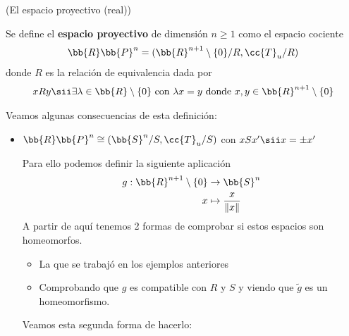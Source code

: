  \begin{ejemplo}
    (El espacio proyectivo (real))

    Se define el \textbf{espacio proyectivo} de dimensión $n\geq 1$ como el espacio cociente
    \begin{align*}
        \bb{R}\bb{P}^n = (\bb{R}^{n+1}\setminus \{0\}/R, \cc{T}_u/R)
    \end{align*}
    donde $R$ es la relación de equivalencia dada por 
    \begin{align*}
        xRy \sii \exists \lambda \in \bb{R}\setminus \{0\} \text{ con } \lambda x = y \text{ donde } x,y\in \bb{R}^{n+1}\setminus \{0\}
    \end{align*}

    Veamos algunas consecuencias de esta definición:

    \begin{itemize}
        \item $\bb{R}\bb{P}^n \cong (\bb{S}^n/S, \cc{T}_u/S)$ con $xSx' \sii x=\pm x'$
    

        \begin{figure}[H]
            \centering
        \end{figure}

        Para ello podemos definir la siguiente aplicación
        \begin{align*}
            g:\bb{R}^{n+1} \setminus \{0\} &\to \bb{S}^n\\
            x &\mapsto \frac{x}{\|x\|}
        \end{align*}
        A partir de aquí tenemos 2 formas de comprobar si estos espacios son homeomorfos.
        \begin{itemize}
            \item La que se trabajó en los ejemplos anteriores
            \item Comprobando que $g$ es compatible con $R$ y $S$ y viendo que $\tilde{g}$ es un homeomorfismo. 
        \end{itemize}
        Veamos esta segunda forma de hacerlo:


\end{itemize}
\end{ejemplo}
